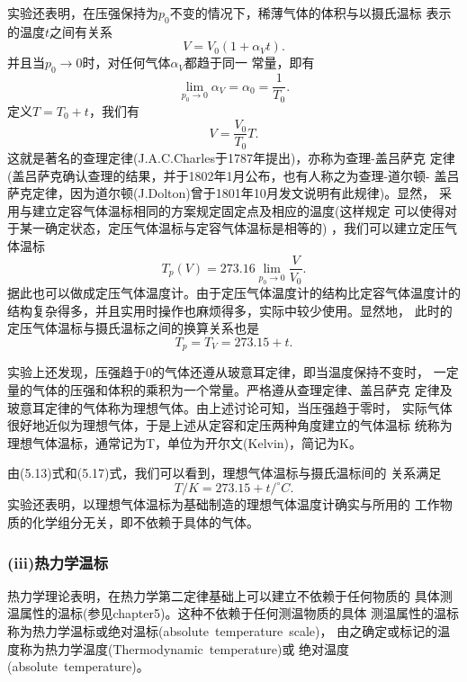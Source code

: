 实验还表明，在压强保持为$p_0$不变的情况下，稀薄气体的体积与以摄氏温标
表示的温度$t$之间有关系
\begin{equation}
    V=V_0(1+\alpha_Vt).
\end{equation}
并且当$p_0\rightarrow 0$时，对任何气体$\alpha_V$都趋于同一
常量，即有 
\begin{equation}
    \lim \limits_{p_0\rightarrow 0}\alpha_V=\alpha_0=\frac{1}{T_0}.
\end{equation}
定义$T=T_0+t$，我们有 
\begin{equation}
    V=\frac{V_0}{T_0}T.
\end{equation}
这就是著名的查理定律(J.A.C.Charles于1787年提出)，亦称为查理-盖吕萨克
定律(盖吕萨克确认查理的结果，并于1802年1月公布，也有人称之为查理-道尔顿-
盖吕萨克定律，因为道尔顿(J.Dolton)曾于1801年10月发文说明有此规律)。显然，
采用与建立定容气体温标相同的方案规定固定点及相应的温度(这样规定
可以使得对于某一确定状态，定压气体温标与定容气体温标是相等的)
，我们可以建立定压气体温标
\begin{equation}
    T_p(V)=273.16\lim \limits_{p_0\rightarrow 0}\frac{V}{V_0}.
\end{equation}
据此也可以做成定压气体温度计。由于定压气体温度计的结构比定容气体温度计的
结构复杂得多，并且实用时操作也麻烦得多，实际中较少使用。显然地，
此时的定压气体温标与摄氏温标之间的换算关系也是
\begin{equation}
    T_p=T_V=273.15+t.
\end{equation}

实验上还发现，压强趋于0的气体还遵从玻意耳定律，即当温度保持不变时，
一定量的气体的压强和体积的乘积为一个常量。严格遵从查理定律、盖吕萨克 
定律及玻意耳定律的气体称为理想气体。由上述讨论可知，当压强趋于零时，
实际气体很好地近似为理想气体，于是上述从定容和定压两种角度建立的气体温标
统称为理想气体温标，通常记为T，单位为开尔文(Kelvin)，简记为K。

由(5.13)式和(5.17)式，我们可以看到，理想气体温标与摄氏温标间的
关系满足
\begin{equation}
    T/K=273.15+t/^{\circ}C.
\end{equation}
实验还表明，以理想气体温标为基础制造的理想气体温度计确实与所用的
工作物质的化学组分无关，即不依赖于具体的气体。

\subsubsection{(iii)热力学温标}

热力学理论表明，在热力学第二定律基础上可以建立不依赖于任何物质的
具体测温属性的温标(参见chapter5)。这种不依赖于任何测温物质的具体
测温属性的温标称为热力学温标或绝对温标(absolute~temperature~scale)，
由之确定或标记的温度称为热力学温度(Thermodynamic~temperature)或 
绝对温度(absolute~temperature)。

